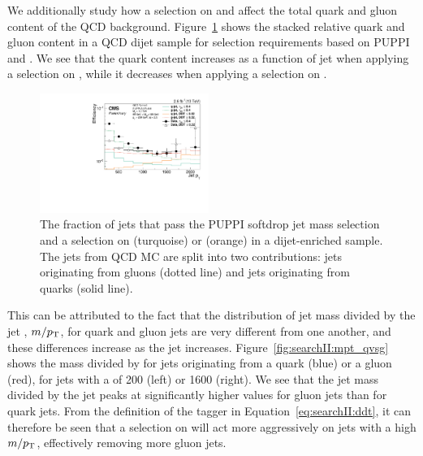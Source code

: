 We additionally study how a selection on \nsubj and \ddt affect the total quark and gluon content of the QCD background. Figure~\ref{fig:searchII:qgfakerate} shows the stacked relative quark and gluon content in a  QCD dijet sample for selection requirements based on PUPPI \nsubj and \ddt. We see that the quark content increases as a function of jet \PT when applying a selection on \ddt, while it decreases when applying a selection on \nsubj.
\begin{figure}[h!]
\centering
\includegraphics[width=0.49\textwidth]{figures/vtagging/JME-16-003/BoostedW/qgFakeRate_Pythia8_pT.pdf}
\caption{ 
The fraction of jets that pass the PUPPI softdrop jet mass selection and a selection on \nsubj (turquoise) or \ddt (orange) in a dijet-enriched sample. The jets from QCD MC are split into two contributions: jets originating from gluons (dotted line) and jets originating from quarks (solid line).}
\label{fig:searchII:qgfakerate}
\end{figure}
 This can be attributed to the fact that the distribution of jet mass divided by the jet \PT, $m/p_{\mathrm{T}}$, for quark and gluon jets are very different from one another, and these differences increase as the jet \PT increases. Figure~\ref{fig:searchII:mpt_qvsg} shows the mass divided by \PT for jets originating from a quark (blue) or a gluon (red), for jets with a \PT of 200 \GeV (left) or 1600 \GeV (right). We see that the jet mass divided by the jet \PT peaks at significantly higher values for gluon jets than for quark jets. From the definition of the \ddt tagger in Equation~\ref{eq:searchII:ddt}, it can therefore be seen that a selection on \ddt will act more aggressively on jets with a high $m/p_{\mathrm{T}}$, effectively removing more gluon jets.
